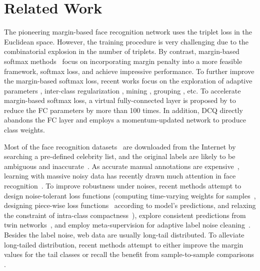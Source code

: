 \documentclass[10pt,twocolumn,letterpaper]{article}
\begin{document}
\section{Related Work}
The pioneering margin-based face recognition network \cite{schroff2015facenet} uses the triplet loss in the Euclidean space. However, the training procedure is very challenging due to the combinatorial explosion in the number of triplets. By contrast, margin-based softmax methods~\cite{liu2017sphereface,tencent2018CosineFace,wang2018additive,deng2019arcface} focus on incorporating margin penalty into a more feasible framework, softmax loss, and achieve impressive performance. To further improve the margin-based softmax loss, recent works focus on the exploration of adaptive parameters \cite{zhang2019p2sgrad,zhang2019adacos,liu2019adaptiveface}, inter-class regularization \cite{zhao2019regularface,duan2019uniformface}, mining \cite{wang2019mis,huang2020curricularface,xu2021consistent}, grouping \cite{kim2020groupface}, etc.
To accelerate margin-based softmax loss, a virtual fully-connected layer is proposed by \cite{li2021virtual} to reduce the FC parameters by more than 100 times. In addition, DCQ \cite{bi2021dcq} directly abandons the FC layer and employs a momentum-updated network to produce class weights. 

Most of the face recognition datasets~\cite{cao2018vggface2,zhu2021webface260m} are downloaded from the Internet by searching a pre-defined celebrity list, and the original labels are likely to be ambiguous and inaccurate~\cite{wang2018devil}. As accurate manual annotations are expensive~\cite{wang2018devil}, learning with massive noisy data has recently drawn much attention in face recognition~\cite{wu2018light,hu2019noise,zhong2019unequal,wang2019co,deng2020sub,zhang2021adaptive}. To improve robustness under noises, recent methods attempt to design noise-tolerant loss functions (\eg computing time-varying weights for samples~\cite{hu2019noise}, designing piece-wise loss functions~\cite{zhong2019unequal} according to model's predictions, and relaxing the constraint of intra-class compactness~\cite{deng2020sub}), explore consistent predictions from twin networks~\cite{wang2019co}, and employ meta-supervision for adaptive label noise cleaning~\cite{zhang2021adaptive}. Besides the label noise, web data are usually long-tail distributed. To alleviate long-tailed distribution, recent methods attempt to either improve the margin values for the tail classes \cite{liu2019adaptiveface} or recall the benefit from sample-to-sample comparisons \cite{zhu2019largeijcv,du2020semi,bi2021dcq,deng2021variational}.
\end{document}

